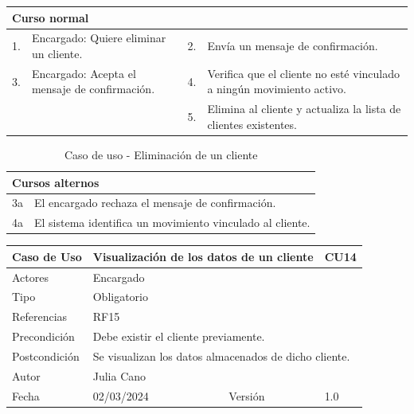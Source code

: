 \begin{table}[H]
	\centering
	\begin{tabular}{| m{} | m{} | m{} | m{} |}
		\hline
		\multicolumn{4}{|m{0.9\textwidth}|}{Curso normal}     \\ 
		\hline
		1. & Encargado: Quiere eliminar un cliente. & 2. &  Envía un mensaje de confirmación.  \\ 
		\hline
		3. & Encargado: Acepta el mensaje de confirmación. &  4. & Verifica que el cliente no esté vinculado a ningún movimiento activo.   \\ 
		\hline
		 &  & 5. & Elimina al cliente y actualiza la lista de clientes existentes.  \\ 
		\hline
	\end{tabular}
\end{table}

\begin{table}[H]
	\centering
	\begin{tabular}{| m{} | m{} | m{} | m{} |}
		\hline
		\multicolumn{4}{|m{0.9\textwidth}|}{Cursos alternos}     \\ 
		\hline
		3a & \multicolumn{3}{m{0.67\textwidth}|}{El encargado rechaza el mensaje de confirmación.} \\ 
		\hline
		4a & \multicolumn{3}{m{0.67\textwidth}|}{El sistema identifica un movimiento vinculado al cliente.} \\ 
		\hline
	\end{tabular}
	\caption{Caso de uso - Eliminación de un cliente}
\end{table}

\newpage


\begin{table}[H]
	\centering
	\begin{tabular}{| m{} | m{} | m{} | m{}|}
		\hline
		\rowcolor{grayshade} Caso de Uso & \multicolumn{2}{|m{0.43\textwidth}|}{Visualización de los datos de un cliente} &  CU14\\ 
		\hline
		Actores & \multicolumn{3}{l|}{Encargado} \\ 
		\hline
		Tipo & \multicolumn{3}{l|}{Obligatorio} \\ 
		\hline
		Referencias & \multicolumn{3}{l|}{RF15} \\ 
		\hline
		Precondición & \multicolumn{3}{m{0.67\textwidth}|}{Debe existir el cliente previamente.} \\ 
		\hline
		Postcondición & \multicolumn{3}{m{0.67\textwidth}|}{Se visualizan los datos almacenados de dicho cliente.} \\ 
		\hline
		Autor & \multicolumn{3}{l|}{Julia Cano} \\ 
		\hline
		Fecha & 02/03/2024 & Versión & 1.0 \\
		\hline
	\end{tabular}
\end{table}

